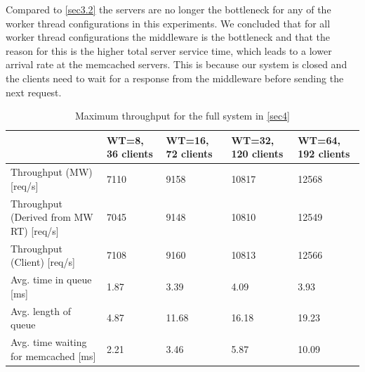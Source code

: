 \documentclass[11pt,a4paper]{article}
\begin{document}
Compared to \autoref{sec3.2} the servers are no longer the bottleneck for any of the worker thread configurations in this experiments. We concluded that for all worker thread configurations the middleware is the bottleneck and that the reason for this is the higher total server service time, which leads to a lower arrival rate at the memcached servers. This is because our system is closed and the clients need to wait for a response from the middleware before sending the next request.



\begin{center}
\begin{table}[H]
	\begin{tabular}{|l|p{1.7cm}|p{1.7cm}|p{1.75cm}|p{1.75cm}|}
		\hline                                              & WT=8, 36 clients & WT=16, 72 clients    & WT=32, 120 clients    & WT=64, 192 clients   \\ 
		\hline Throughput (MW) [req/s]                      & 7110              & 9158                & 10817                 & 12568                 \\ 
		\hline Throughput (Derived from MW RT) [req/s]      & 7045              & 9148                & 10810                 & 12549         \\
		\hline Throughput (Client) [req/s]                  & 7108              & 9160                & 10813                 & 12566                 \\ 
		\hline Avg. time in queue [ms]                      & 1.87            & 3.39              & 4.09                & 3.93                  \\ 
		\hline Avg. length of queue                         & 4.87              & 11.68               & 16.18                 & 19.23                 \\ 
		\hline Avg. time waiting for memcached [ms]         & 2.21            & 3.46                & 5.87                & 10.09                 \\ 
		\hline 
	\end{tabular}
	\caption{Maximum throughput for the full system in \autoref{sec4}} 
	\label{res4}
\end{table}
\end{center}
\end{document}
